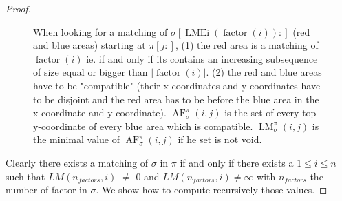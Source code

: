 \documentclass[a4paper]{llncs}
\newcommand{\ptext}{\pi}
\newcommand{\ppattern}{\sigma}
\newcounter{num}
\DeclareMathOperator{\LMEi}{LMEi}
\DeclareMathOperator{\factor}{factor}
\DeclareMathOperator{\LMa}{LM}
\newcommand{\LM}[4]{\LMa_{{#1}}^{{#2}}(#3,#4)}
\DeclareMathOperator{\AFa}{AF}
\newcommand{\AF}[4]{\AFa_{{#1}}^{{#2}}(#3,#4)}
\begin{document}
\begin{proof}
\begin{figure}[t]
	
	
	\caption{
		When looking for a matching of $\sigma[\LMEi(\factor(i)):]$ (red and blue areas) starting at $\pi[j:]$, (1) the red area is a matching of $\factor(i)$ ie. if and only if
		its contains an increasing subsequence of size equal or bigger than $|\factor(i)|$.
		(2) the red and blue areas have to be "compatible" (their x-coordinates and y-coordinates have to be disjoint and the red area has to be before the blue area in the x-coordinate and y-coordinate).
		$\AF{\ppattern}{\ptext}{i}{j}$ is the set of every top y-coordinate of every blue area which is compatible. $\LM{\ppattern}{\ptext}{i}{j}$ is the minimal value of $\AF{\ppattern}{\ptext}{i}{j}$ if he set is not void.}	
	\label{fig: algo 1 fig}	
\end{figure}

Clearly there exists a matching of $\ppattern$ in $\ptext$ if and only if
there exists a $1 \leq i \leq n$ such that $LM(n_{factors},i)$ $\neq$ $0$ and $LM(n_{factors},i)\neq \infty$
with $n_{factors}$ the number of factor in $\ppattern$.
We show how to compute recursively those values.


\end{proof}
\end{document}

